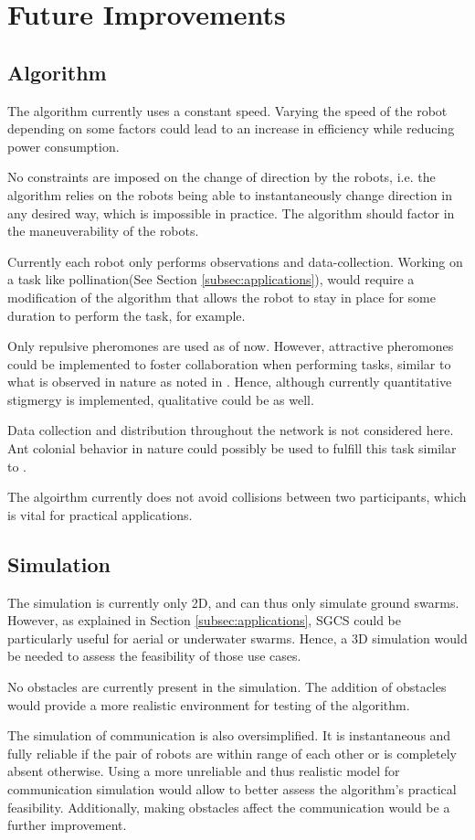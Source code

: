 \section{Future Improvements} 
\subsection{Algorithm}
The algorithm currently uses a constant speed. Varying the speed of the robot depending on some factors could lead to an increase in efficiency while reducing power consumption. 
\par No constraints are imposed on the change of direction by the robots, i.e. the algorithm relies on the robots being able to instantaneously change direction in any desired way, which is impossible in practice. The algorithm should factor in the maneuverability of the robots.
\par Currently each robot only performs observations and data-collection. Working on a task like pollination(See Section \ref{subsec:applications}), would require a modification of the algorithm that allows the robot to stay in place for some duration to perform the task, for example.
\par Only repulsive pheromones are used as of now. However, attractive pheromones could be implemented to foster collaboration when performing tasks, similar to what is observed in nature as noted in \parencite{david_morgan_trail_2009}. Hence, although currently quantitative stigmergy is implemented, qualitative could be as well.
\par Data collection and distribution throughout the network is not considered here. Ant colonial behavior in nature could possibly be used to fulfill this task similar to \parencite{adler_information_1992}.
\par The algoirthm currently does not avoid collisions between two participants, which is vital for practical applications.
\subsection{Simulation}
The simulation is currently only 2D, and can thus only simulate ground swarms. However, as explained in Section \ref{subsec:applications}, SGCS could be particularly useful for aerial or underwater swarms. Hence, a 3D simulation would be needed to assess the feasibility of those use cases.
\par No obstacles are currently present in the simulation. The addition of obstacles would provide a more realistic environment for testing of the algorithm.
\par The simulation of communication is also oversimplified. It is instantaneous and fully reliable if the pair of robots are within range of each other or is completely absent otherwise. Using a more unreliable and thus realistic model for communication simulation would allow to better assess the algorithm's practical feasibility. Additionally, making obstacles affect the communication would be a further improvement.
